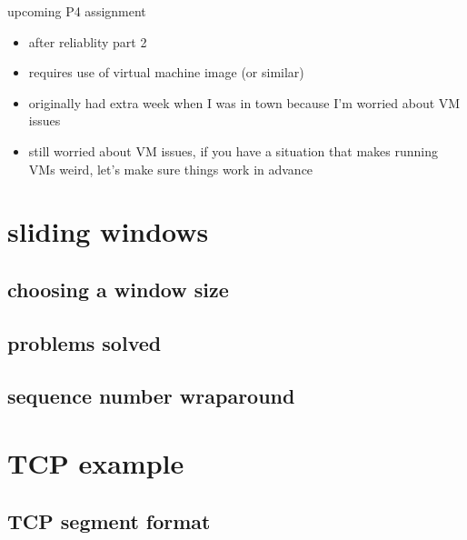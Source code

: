 \begin{frame}{upcoming P4 assignment}
    \begin{itemize}
    \item after reliablity part 2
    \item requires use of virtual machine image (or similar)
    \item originally had extra week when I was in town because I'm worried about VM issues
    \vspace{.5cm}
    \item still worried about VM issues, if you have a situation that makes running VMs weird,
        let's make sure things work in advance
    \end{itemize}
\end{frame}

\section{sliding windows}
\subsection{choosing a window size}


\subsection{problems solved}


\subsection{sequence number wraparound}


\section{TCP example}

\subsection{TCP segment format}


%

